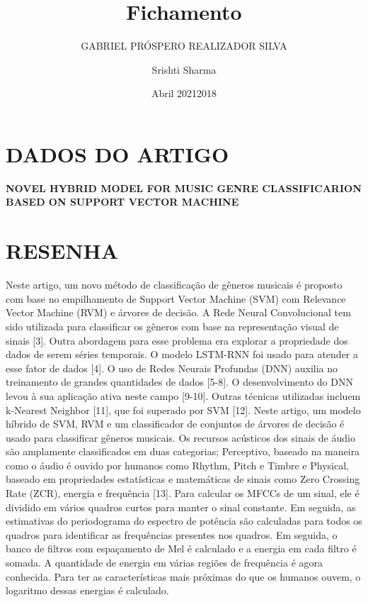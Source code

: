 \documentclass{article}
\title{Fichamento}
\author{GABRIEL PRÓSPERO REALIZADOR  SILVA}
\date{Abril 2021}
\begin{document}
\maketitle

\section{DADOS DO ARTIGO}
\textbf{NOVEL HYBRID MODEL FOR MUSIC GENRE CLASSIFICARION BASED ON SUPPORT VECTOR MACHINE \\}
\author{Srishti Sharma \\}
\date{2018}

\section{RESENHA}
Neste artigo, um novo método de classificação de gêneros musicais é proposto com base no empilhamento de Support Vector Machine (SVM) com Relevance Vector Machine (RVM) e árvores de decisão.
A Rede Neural Convolucional tem sido utilizada para classificar os gêneros com base na representação visual de sinais [3].
Outra abordagem para esse problema era explorar a propriedade dos dados de serem séries temporais. O modelo LSTM-RNN foi usado para atender a esse fator de dados [4]. O uso de Redes Neurais Profundas (DNN) auxilia no treinamento de grandes quantidades de dados [5-8]. O desenvolvimento do DNN levou à sua aplicação ativa neste campo [9-10]. Outras técnicas utilizadas incluem k-Nearest Neighbor [11], que foi superado por SVM [12]. Neste artigo, um modelo híbrido de SVM, RVM e um classificador de conjuntos de árvores de decisão é usado para classificar gêneros musicais.
Os recursos acústicos dos sinais de áudio são amplamente classificados em duas categorias; Perceptivo, baseado na maneira como o áudio é ouvido por humanos como Rhythm, Pitch e Timbre e Physical, baseado em propriedades estatísticas e matemáticas de sinais como Zero Crossing Rate (ZCR), energia e frequência [13].
Para calcular os MFCCs de um sinal, ele é dividido em vários quadros curtos para manter o sinal constante. Em seguida, as estimativas do periodograma do espectro de potência são calculadas para todos os quadros para identificar as frequências presentes nos quadros. Em seguida, o banco de filtros com espaçamento de Mel é calculado e a energia em cada filtro é somada. A quantidade de energia em várias regiões de frequência é agora conhecida. Para ter as características mais próximas do que os humanos ouvem, o logaritmo dessas energias é calculado.
\end{document}
